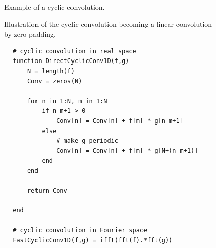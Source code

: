 \begin{figure}
    \centering
    
    \caption{Example of a cyclic convolution.}
    \label{fig:cyclic_convolution}
\end{figure}

\begin{figure}
    \centering
    
    \caption{Illustration of the cyclic convolution becoming a linear convolution
    by zero-padding.}
    \label{fig:cyclic_linear_convolution}
\end{figure}


\begin{codebox}[!htb]
    \begin{verbatim}
        # cyclic convolution in real space
        function DirectCyclicConv1D(f,g)
            N = length(f)
            Conv = zeros(N)  

            for n in 1:N, m in 1:N
                if n-m+1 > 0
                    Conv[n] = Conv[n] + f[m] * g[n-m+1]
                else
                    # make g periodic
                    Conv[n] = Conv[n] + f[m] * g[N+(n-m+1)]
                end
            end

            return Conv

        end

        # cyclic convolution in Fourier space
        FastCyclicConv1D(f,g) = ifft(fft(f).*fft(g))
    \end{verbatim}
    \caption{Cyclic convolution in Julia.}
    \label{code:cyclic_convolution}
\end{codebox}


